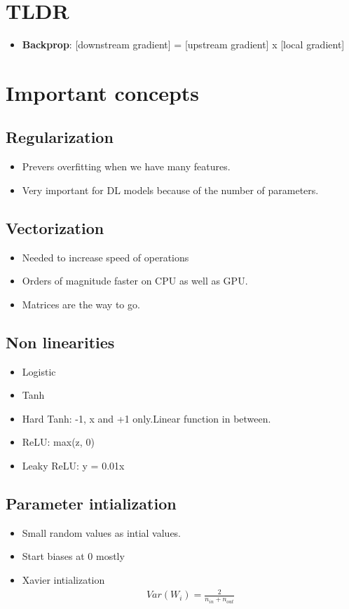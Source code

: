 \documentclass[a4paper]{article}
\begin{document}
\section{TLDR}
\begin{itemize}
    \item \textbf{Backprop}: [downstream gradient] = [upstream  gradient] x [local gradient] 
\end{itemize}
\section{Important concepts}
\subsection{Regularization}
\begin{itemize}
    \item Prevers overfitting when we have many features.
    \item Very important for DL models because of the number of parameters.
\end{itemize}
\subsection{Vectorization}
\begin{itemize}
    \item Needed to increase speed of operations
    \item Orders of magnitude faster on CPU as well as GPU.
    \item Matrices are the way to go.
\end{itemize}
\subsection{Non linearities}
\begin{itemize}
    \item Logistic
    \item Tanh
    \item Hard Tanh: -1, x and +1 only.Linear function in between.
    \item ReLU: max(z, 0)
    \item Leaky ReLU: y = 0.01x
\end{itemize}
\subsection{Parameter intialization}
\begin{itemize}
    \item Small random values as intial values.
    \item Start biases at 0 mostly
    \item Xavier intialization
    \begin{equation}
    \begin{split}
        Var(W_i) = \frac{2}{n_{in} + n_{out}} 
    \end{split}
    \end{equation}
\end{itemize}
\end{document}
